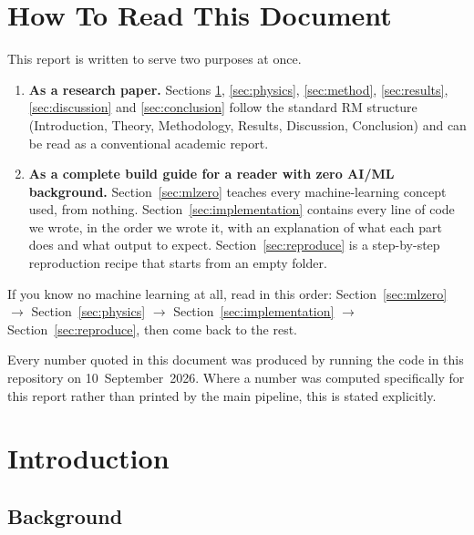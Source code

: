 \documentclass[11pt,a4paper]{article}
\begin{document}
\section*{How To Read This Document}

This report is written to serve two purposes at once.

\begin{enumerate}[leftmargin=2em]
  \item \textbf{As a research paper.} Sections \ref{sec:intro}, \ref{sec:physics},
        \ref{sec:method}, \ref{sec:results}, \ref{sec:discussion} and \ref{sec:conclusion}
        follow the standard RM structure (Introduction, Theory, Methodology, Results, Discussion,
        Conclusion) and can be read as a conventional academic report.
  \item \textbf{As a complete build guide for a reader with zero AI/ML background.}
        Section~\ref{sec:mlzero} teaches every machine-learning concept used, from nothing.
        Section~\ref{sec:implementation} contains every line of code we wrote, in the order we
        wrote it, with an explanation of what each part does and what output to expect.
        Section~\ref{sec:reproduce} is a step-by-step reproduction recipe that starts from an
        empty folder.
\end{enumerate}

If you know no machine learning at all, read in this order: Section~\ref{sec:mlzero} $\rightarrow$
Section~\ref{sec:physics} $\rightarrow$ Section~\ref{sec:implementation} $\rightarrow$
Section~\ref{sec:reproduce}, then come back to the rest.

Every number quoted in this document was produced by running the code in this repository on
10~September~2026. Where a number was computed specifically for this report rather than printed by
the main pipeline, this is stated explicitly.

\clearpage
\tableofcontents
\clearpage

\section{Introduction}\label{sec:intro}

\subsection{Background}
\end{document}
